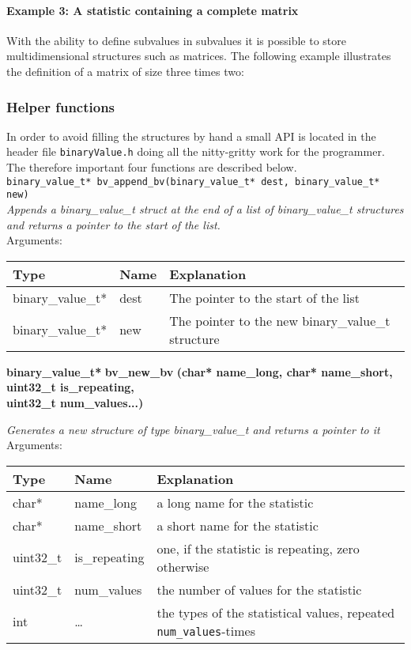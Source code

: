 \documentclass[documentation]{subfiles}
\begin{document}
\paragraph{Example 3: A statistic containing a complete matrix}
With the ability to define subvalues in subvalues it is possible to store multidimensional structures such as matrices. The following example illustrates the definition of a matrix of size three times two:
\begin{figure}[H]
    \centering
\end{figure}

\subsubsection{Helper functions}
In order to avoid filling the structures by hand a small API is located in the header file {\tt binaryValue.h} doing all the nitty-gritty work for the programmer. The therefore important four functions are described below.\\[2ex]
{\tt binary\_value\_t* bv\_append\_bv(binary\_value\_t* dest, binary\_value\_t* new)} \\
{\em Appends a binary\_value\_t struct at the end of a list of binary\_value\_t structures and returns a pointer to the start of the list.}\\[2ex]
Arguments:
\begin{longtable}{lll}
    \toprule
    {\bf Type} & {\bf Name} & {\bf Explanation} \\
    \midrule\endhead%
    binary\_value\_t* & dest & The pointer to the start of the list \\
    binary\_value\_t* & new & The pointer to the new binary\_value\_t structure \\
    \bottomrule
\end{longtable}
\vspace{18pt}
\begin{tabbing}
\={\bf binary\_value\_t*} \={\bf bv\_new\_bv} \={\bf (char* name\_long, char* name\_short, uint32\_t is\_repeating,} \\
\>\>\>  {\bf uint32\_t num\_values...)} \\
\end{tabbing}
{\em Generates a new structure of type binary\_value\_t and returns a pointer to it}\\[2ex]
Arguments:
\begin{longtable}{lll}
    \toprule
    {\bf Type} & {\bf Name} & {\bf Explanation} \\
    \midrule\endhead%
    char* & name\_long & a long name for the statistic \\
    char* & name\_short & a short name for the statistic \\
    uint32\_t & is\_repeating & one, if the statistic is repeating, zero otherwise \\
    uint32\_t & num\_values & the number of values for the statistic \\
    int & \ldots & the types of the statistical values, repeated {\tt num\_values}-times \\
    \bottomrule
\end{longtable}
\end{document}
